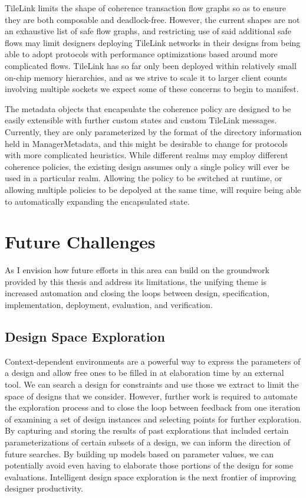 TileLink limits the shape of coherence transaction flow graphs so as to ensure they are both composable and deadlock-free.
However, the current shapes are not an exhaustive list of safe flow graphs,
and restricting use of said additional safe flows may limit designers deploying TileLink networks in their designs
from being able to adopt protocols with performance optimizations based around more complicated flows.
TileLink has so far only been deployed within relatively small on-chip memory hierarchies,
and as we strive to scale it to larger client counts involving multiple sockets
 we expect some of these concerns to begin to manifest. 

The metadata objects that encapsulate the coherence policy are designed to be easily extensible with
further custom states and custom TileLink messages.
Currently, they are only parameterized by the format of the directory information held in ManagerMetadata,
and this might be desirable to change for protocols with more complicated heuristics.
While different realms may employ different coherence policies,
the existing design assumes only a single policy will ever be used in a particular realm.
Allowing the policy to be switched at runtime, or allowing multiple policies to be depolyed at the same time,
will require being able to automatically expanding the encapsulated state.

\section{Future Challenges}

As I envision how future efforts in this area can build on the groundwork provided by this thesis and address its limitations,
the unifying theme is increased automation and closing the loops between
design, specification, implementation, deployment, evaluation, and verification.

\subsection{Design Space Exploration}

Context-dependent environments are a powerful way to express the parameters of a design and allow free ones
to be filled in at elaboration time by an external tool.
We can search a design for constraints and use those we extract to limit the space of designs that we consider.
However, further work is required to automate the exploration process and 
to close the loop between feedback from one iteration of examining a
set of design instances and selecting points for further exploration.
By capturing and storing the results of past explorations that included certain parameterizations
of certain subsets of a design, we can inform the direction of future searches.
By building up models based on parameter values, we can potentially avoid even having to elaborate those
portions of the design for some evaluations.
Intelligent design space exploration is the next frontier of improving designer productivity.

